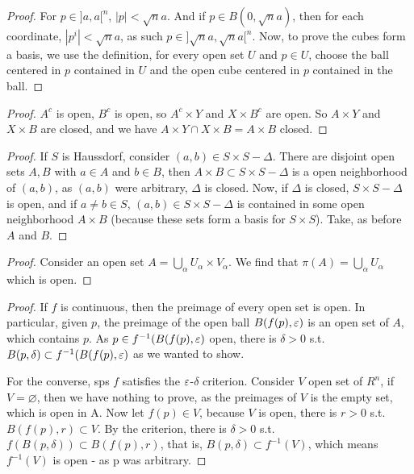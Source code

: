 \prob
\begin{proof}
	For $p \in ]a,a[^n$, $ |p| < \sqrt{n}a$. And if $p \in B(0, \sqrt{n}a)$, then for each coordinate, $|p^i| < \sqrt{n}a$, as such
	$p \in ]\sqrt{n}a,\sqrt{n}a[^n$. Now, to prove the cubes form a basis, we use the definition, for every open set $U$ and $p \in U$,
	choose the ball centered in $p$ contained in $U$ and the open cube centered in $p$ contained in the ball.
\end{proof}

\prob
\begin{proof}
	$A^c$ is open, $B^c$ is open, so $A^c\times Y$ and $X \times B^c$ are open. So $A \times Y$ and $X \times B$ are closed,
	and we have $A \times Y \cap  X \times B = A \times B$ closed.
\end{proof}

\prob
\begin{proof}
	If $S$ is Haussdorf, consider $(a,b) \in S\times S - \Delta$. There are disjoint open sets $A,B$ with $a \in A$ and $b \in B$,
	then $A \times B \subset S\times S - \Delta$ is a open neighborhood of $(a,b)$, as $(a,b)$ were arbitrary, $\Delta$ is closed.
	Now, if $\Delta$ is closed, $S\times S - \Delta$ is open, and if $a \neq b \in S$, $(a,b) \in S\times S - \Delta$ is contained in
	some open neighborhood $A \times B$ (because these sets form a basis for $S\times S$). Take, as  before $A$ and $B$.
\end{proof}

\prob

\begin{proof}
	Consider an open set $A = \bigcup_\alpha U_\alpha \times V_\alpha$. We find that $\pi(A) = \bigcup_\alpha U_\alpha$ which is open.
\end{proof}

\prob
\begin{proof}
	If $f$ is continuous, then the preimage of every open set is open. In particular, given $p$, the preimage of the open ball $B(f(p),\varepsilon)$
	is an open set of $A$, which contains $p$. As $p \in f^{-1}(B(f(p), \varepsilon)$ open, there is $\delta > 0$ s.t. $B(p,\delta) \subset f^{-1}(B(f(p), \varepsilon)$
	as we wanted to show.

	For the converse, sps $f$ satisfies the $\varepsilon$-$\delta$ criterion. Consider $V$ open set of $R^n$, if $V = \varnothing$, then
	we have nothing to prove, as the preimages of $V$ is the empty set, which is open in A. Now let $f(p) \in V$, because $V$ is open, there is $r>0$ s.t.
	$B(f(p), r) \subset V$. By the criterion, there is $\delta > 0$ s.t. $f(B(p,\delta)) \subset B(f(p), r)$, that is, $B(p,\delta) \subset f^{-1}(V)$, which means
	$f^{-1}(V)$ is open - as p was arbitrary.
\end{proof}

